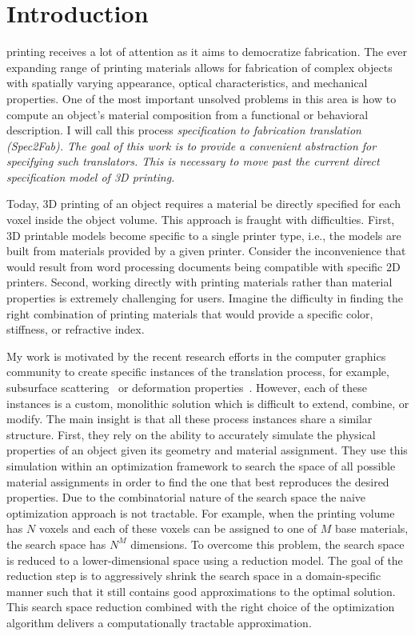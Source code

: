
\renewcommand{\figdir}{figures/chap1}
%
\chapter{Introduction}
\label{chap:intro}
%
 printing receives a lot of attention as it aims to democratize fabrication.
The ever expanding range of printing materials allows for fabrication of complex objects with spatially varying appearance, optical characteristics, and mechanical properties.
One of the most important unsolved problems in this area is how to compute an object's material composition from a functional or behavioral description. I will call this process \em specification to fabrication translation (Spec2Fab). 
The goal of this work is to provide a convenient abstraction for specifying such translators. This is necessary to move past the current direct specification model of 3D printing.

Today,  3D printing of an object requires a material be directly specified for each voxel inside the object volume. This approach is fraught with difficulties. First, 3D printable models become specific to a single printer type, i.e., the models are built from materials provided by a given printer. Consider the inconvenience that would result from  word processing documents being compatible with specific 2D printers. Second, working directly with printing materials rather than material properties is extremely challenging for users. Imagine the difficulty in finding the right combination of printing materials that would provide a specific color, stiffness, or refractive index.

My work is motivated by the recent research efforts in the computer graphics community to create specific instances of the translation process, for example, subsurface scattering~\cite{Hasan:2010:PRO,Dong:2010:FSS} or deformation properties~\cite{Bickel:2010:DAF}. However, each of these instances is a custom, monolithic solution which is difficult to extend, combine, or modify. The main insight is that all these process instances share a similar structure. First, they rely on the ability to accurately simulate the physical properties of an object given its geometry and material assignment. They use this simulation within an optimization framework to search the space of all possible material assignments in order to find the one that best reproduces the desired properties. Due to the combinatorial nature of the search space the naive optimization approach is not tractable. For example, when the printing volume has $N$ voxels and each of these voxels can be assigned to one of $M$ base materials, the search space has $N^M$ dimensions. To overcome this problem, the search space is reduced to a lower-dimensional space using a reduction model. The goal of the reduction step is to aggressively shrink the search space in a domain-specific manner such that it still contains good approximations to the optimal solution. This search space reduction combined with the right choice of the optimization algorithm delivers a computationally tractable approximation.

